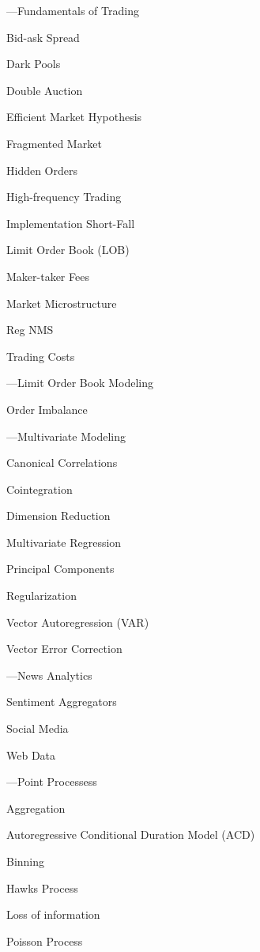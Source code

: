 %
\begin{minipage}{0.40\textwidth}
\noindent ---Fundamentals of Trading 
	\begin{flushright}
	Bid-ask Spread \par
	Dark Pools \par
	Double Auction \par
	Efficient Market Hypothesis \par
	Fragmented Market \par
	Hidden Orders \par
	High-frequency Trading \par
	Implementation Short-Fall \par
	Limit Order Book (LOB) \par
	Maker-taker Fees \par
	Market Microstructure \par
	Reg NMS \par
	Trading Costs
	\end{flushright}


\noindent ---Limit Order Book Modeling
	\begin{flushright}
	Order Imbalance
	\end{flushright}


\noindent ---Multivariate Modeling
	\begin{flushright}
	Canonical Correlations \par
	Cointegration \par
	Dimension Reduction \par
	Multivariate Regression \par
	Principal Components \par
	Regularization \par
	Vector Autoregression (VAR) \par
	Vector Error Correction
	\end{flushright}


\noindent ---News Analytics
	\begin{flushright}
	Sentiment Aggregators \par
	Social Media \par
	Web Data 
	\end{flushright}


\noindent ---Point Processess
	\begin{flushright}
	Aggregation \par
	Autoregressive Conditional Duration Model (ACD) \par
	Binning \par
	Hawks Process \par
	Loss of information \par
	Poisson Process
	\end{flushright}
\end{minipage} \newpage

